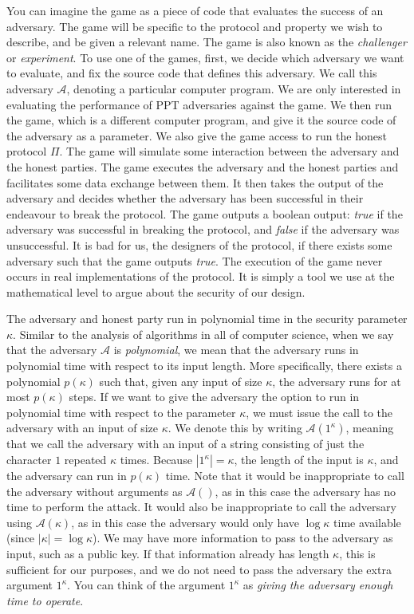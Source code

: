 You can imagine the game as a piece of code that evaluates the success of an adversary.
The game will be specific to the protocol and property we wish to describe, and be given
a relevant name. The game is also known as the \emph{challenger} or \emph{experiment}.
To use one of the games, first,
we decide which adversary we want to evaluate, and fix the source code that defines this adversary.
We call this adversary $\mathcal{A}$, denoting a particular computer program.
We are only interested in evaluating the performance of PPT adversaries against the game.
We then run the
game, which is a different computer program, and give it the source code of the adversary as a
parameter. We also give the game access to run the honest protocol $\Pi$. The game will
simulate some interaction between the adversary and the honest parties. The game executes
the adversary and the honest parties and facilitates some data exchange between them. It
then takes the output of the adversary and decides whether the adversary has been successful
in their endeavour to break the protocol. The game outputs a boolean output: \emph{true}
if the adversary was successful in breaking the protocol, and \emph{false} if the adversary
was unsuccessful. It is bad for us, the designers of the protocol, if there exists some
adversary such that the game outputs \emph{true}. The execution of the game never occurs
in real implementations of the protocol. It is simply a tool we use at the mathematical
level to argue about the security of our design.

The adversary and honest party run in polynomial time in the security parameter
$\kappa$. Similar to the analysis of algorithms in all of computer science,
when we say that the adversary $\mathcal{A}$ is \emph{polynomial}, we mean that the
adversary runs in polynomial time with respect to its input length. More specifically, there exists
a polynomial $p(\kappa)$ such that, given any input of size $\kappa$, the adversary runs for
at most $p(\kappa)$ steps. If we want to give the
adversary the option to run in polynomial time with respect to the parameter $\kappa$, we must
issue the call to the adversary with an input of size $\kappa$. We denote this by writing
$\mathcal{A}(1^\kappa)$, meaning that we call the adversary with an input of a string consisting
of just the character $1$ repeated $\kappa$ times. Because $|1^\kappa| = \kappa$, the length of
the input is $\kappa$, and the adversary can run in $p(\kappa)$ time. Note that it would be
inappropriate to call the adversary without arguments as $\mathcal{A}()$, as in this case the
adversary has no time to perform the attack. It would also be inappropriate to call the adversary
using $\mathcal{A}(\kappa)$, as in this case the adversary would only have $\log\kappa$ time
available (since $|\kappa| = \log\kappa$). We may have more information to pass to the adversary
as input, such as a public key. If that information already has length $\kappa$, this is sufficient
for our purposes, and we do not need to pass the adversary the extra argument $1^\kappa$. You
can think of the argument $1^\kappa$ as \emph{giving the adversary enough time to operate}.

